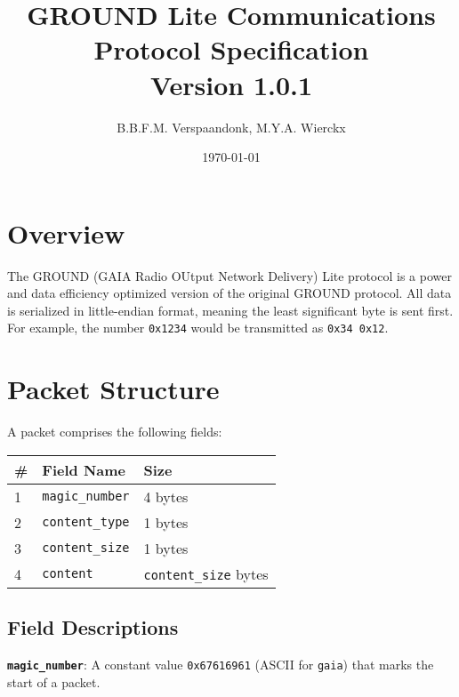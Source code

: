 \documentclass[a4paper]{article}
\title{GROUND Lite Communications Protocol Specification\\ \large Version 1.0.1}
\date{\today}
\author{B.B.F.M. Verspaandonk, M.Y.A. Wierckx}
\begin{document}
\maketitle

\tableofcontents

\section{Overview}
The GROUND (GAIA Radio OUtput Network Delivery) Lite protocol is a power and data efficiency optimized version of the original GROUND protocol. All data is serialized in little-endian format, meaning the least significant byte is sent first. For example, the number \texttt{0x1234} would be transmitted as \texttt{0x34 0x12}.

\section{Packet Structure}
A packet comprises the following fields:
\begin{longtable}{@{}lll@{}}
\toprule
\# & Field Name             & Size                         \\
\midrule
1  & \texttt{magic\_number} & 4 bytes                      \\
2  & \texttt{content\_type} & 1 bytes                      \\
3  & \texttt{content\_size} & 1 bytes                      \\
4  & \texttt{content}       & \texttt{content\_size} bytes \\
\bottomrule
\end{longtable}

\subsection{Field Descriptions}
\textbf{\texttt{magic\_number}}: A constant value \texttt{0x67616961} (ASCII for \texttt{gaia}) that marks the start of a packet.
\end{document}
